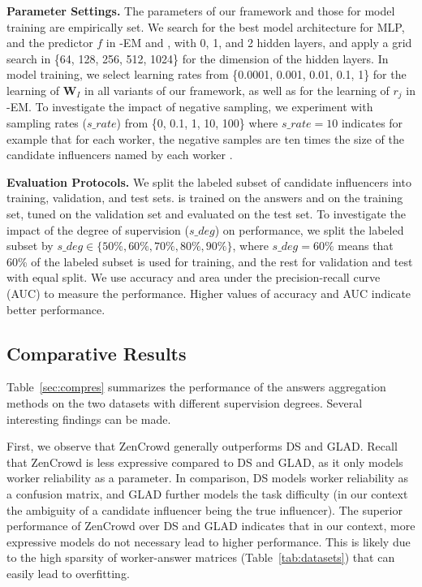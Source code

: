 \smallskip
\noindent\textbf{Parameter Settings.} The parameters of our framework and those for model training are empirically set. We search for the best model architecture for MLP, and the predictor $f$ in \sys-EM and \sys, with 0, 1, and 2 hidden layers, and apply a grid search in \{64, 128, 256, 512, 1024\} for the dimension of the hidden layers. In model training, we select learning rates from \{0.0001, 0.001, 0.01, 0.1, 1\} for the learning of $\mathbf{W}_I$ in all variants of our framework, as well as for the learning of $r_j$ in \sys-EM. To investigate the impact of negative sampling, we experiment with sampling rates ($s\_rate$) from \{0, 0.1, 1, 10, 100\} where $s\_rate=10$ indicates for example that for each worker, the negative samples are ten times the size of the candidate influencers named by each worker . 

\smallskip
\noindent\textbf{Evaluation Protocols.} We split the labeled subset of candidate influencers into training, validation, and test sets. \sys is trained on the answers and on the training set, tuned on the validation set and evaluated on the test set. To investigate the impact of the degree of supervision ($s\_deg$) on \sys performance, we split the labeled subset by $s\_deg\in \{50\%, 60\%, 70\%, 80\%, 90\%\}$, where $s\_deg = 60\%$ means that 60\% of the labeled subset is used for training, and the rest for validation and test with equal split. We use accuracy and area under the precision-recall curve (AUC) to measure the performance. Higher values of accuracy and AUC indicate better performance.



\subsection{Comparative Results}
Table~\ref{sec:compres} summarizes the performance of the answers aggregation methods on the two datasets with different supervision degrees. Several interesting findings can be made.

First, we observe that ZenCrowd generally outperforms DS and GLAD. Recall that ZenCrowd is less expressive compared to DS and GLAD, as it only models worker reliability as a parameter. In comparison, DS models worker reliability as a confusion matrix, and GLAD further models the task difficulty (in our context the ambiguity of a candidate influencer being the true influencer). The superior performance of ZenCrowd  over DS and GLAD indicates that in our context, more expressive models do not necessary lead to higher performance. This is likely due to the high sparsity of worker-answer matrices (Table~\ref{tab:datasets}) that can easily lead to overfitting.

